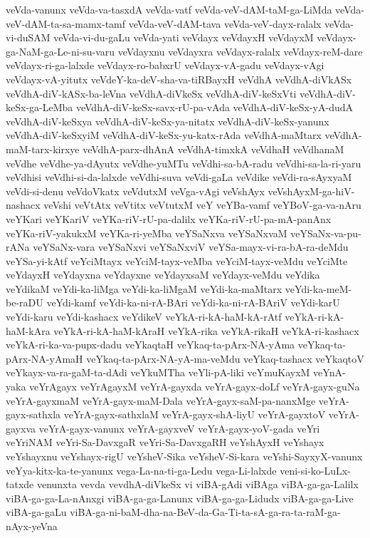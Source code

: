 {veVda-vanunx
veVda-va-tasxdA
veVda-vatf
veVda-veV-dAM-taM-ga-LiMda
veVda-veV-dAM-ta-sa-mamx-tamf
veVda-veV-dAM-tava
veVda-veV-dayx-ralalx
veVda-vi-duSAM
veVda-vi-du-gaLu
veVda-yati
veVdayx
veVdayxH
veVdayxM
veVdayx-ga-NaM-ga-Le-ni-su-varu
veVdayxnu
veVdayxra
veVdayx-ralalx
veVdayx-reM-dare
veVdayx-ri-ga-lalxde
veVdayx-ro-babxrU
veVdayx-vA-gadu
veVdayx-vAgi
veVdayx-vA-yitutx
veVdeY-ka-deV-sha-va-tiRBayxH
veVdhA
veVdhA-diVkASx
veVdhA-diV-kASx-ba-leVna
veVdhA-diVkeSx
veVdhA-diV-keSxVti
veVdhA-diV-keSx-ga-LeMba
veVdhA-diV-keSx-savx-rU-pa-vAda
veVdhA-diV-keSx-yA-dudA
veVdhA-diV-keSxya
veVdhA-diV-keSx-ya-nitatx
veVdhA-diV-keSx-yanunx
veVdhA-diV-keSxyiM
veVdhA-diV-keSx-yu-katx-rAda
veVdhA-maMtarx
veVdhA-maM-tarx-kirxye
veVdhA-parx-dhAnA
veVdhA-timxkA
veVdhaH
veVdhanaM
veVdhe
veVdhe-ya-dAyutx
veVdhe-yuMTu
veVdhi-sa-bA-radu
veVdhi-sa-la-ri-yaru
veVdhisi
veVdhi-si-da-lalxde
veVdhi-suva
veVdi-gaLa
veVdike
veVdi-ra-sAyxyaM
veVdi-si-denu
veVdoVkatx
veVdutxM
veVga-vAgi
veVshAyx
veVshAyxM-ga-hiV-nashacx
veVshi
veVtAtx
veVtitx
veVtutxM
veY
veYBa-vamf
veYBoV-ga-va-nAru
veYKari
veYKariV
veYKa-riV-rU-pa-dalilx
veYKa-riV-rU-pa-mA-panAnx
veYKa-riV-yakukxM
veYKa-ri-yeMba
veYSaNxva
veYSaNxvaM
veYSaNx-va-pu-rANa
veYSaNx-vara
veYSaNxvi
veYSaNxviV
veYSa-mayx-vi-ra-bA-ra-deMdu
veYSa-yi-kAtf
veYciMtayx
veYciM-tayx-veMba
veYciM-tayx-veMdu
veYciMte
veYdayxH
veYdayxna
veYdayxne
veYdayxsaM
veYdayx-veMdu
veYdika
veYdikaM
veYdi-ka-liMga
veYdi-ka-liMgaM
veYdi-ka-maMtarx
veYdi-ka-meM-be-raDU
veYdi-kamf
veYdi-ka-ni-rA-BAri
veYdi-ka-ni-rA-BAriV
veYdi-karU
veYdi-karu
veYdi-kashacx
veYdikeV
veYkA-ri-kA-haM-kA-rAtf
veYkA-ri-kA-haM-kAra
veYkA-ri-kA-haM-kAraH
veYkA-rika
veYkA-rikaH
veYkA-ri-kashacx
veYkA-ri-ka-va-pupx-dadu
veYkaqtaH
veYkaq-ta-pArx-NA-yAma
veYkaq-ta-pArx-NA-yAmaH
veYkaq-ta-pArx-NA-yA-ma-veMdu
veYkaq-tashacx
veYkaqtoV
veYkayx-va-ra-gaM-ta-dAdi
veYkuMTha
veYli-pA-liki
veYmuKayxM
veYnA-yaka
veYrAgayx
veYrAgayxM
veYrA-gayxda
veYrA-gayx-doLf
veYrA-gayx-guNa
veYrA-gayxmaM
veYrA-gayx-maM-Dala
veYrA-gayx-saM-pa-nanxMge
veYrA-gayx-sathxla
veYrA-gayx-sathxlaM
veYrA-gayx-shA-liyU
veYrA-gayxtoV
veYrA-gayxva
veYrA-gayx-vanunx
veYrA-gayxveV
veYrA-gayx-yoV-gada
veYri
veYriNAM
veYri-Sa-DavxgaR
veYri-Sa-DavxgaRH
veYshAyxH
veYshayx
veYshayxnu
veYshayx-rigU
veYsheV-Sika
veYsheV-Si-kara
veYshi-SayxyX-vanunx
veYya-kitx-ka-te-yanunx
vega-La-na-ti-ga-Ledu
vega-Li-lalxde
veni-si-ko-LuLx-tatxde
venunxta
vevda
vevdhA-diVkeSx
vi
viBA-gAdi
viBAga
viBA-ga-ga-Lalilx
viBA-ga-ga-La-nAnxgi
viBA-ga-ga-Lanunx
viBA-ga-ga-Lidudx
viBA-ga-ga-Live
viBA-ga-gaLu
viBA-ga-ni-baM-dha-na-BeV-da-Ga-Ti-ta-sA-ga-ra-ta-raM-ga-nAyx-yeVna
}
